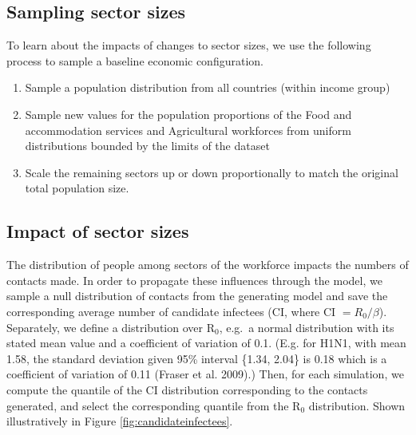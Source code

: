 \documentclass[
]{article}
\providecommand{\tightlist}{%
  \setlength{\itemsep}{0pt}\setlength{\parskip}{0pt}}
\begin{document}
\newpage

\hypertarget{sampling-sector-sizes}{%
\subsection{Sampling sector sizes}\label{sampling-sector-sizes}}

To learn about the impacts of changes to sector sizes, we use the following process to sample a baseline economic configuration.

\begin{enumerate}
\def\labelenumi{\arabic{enumi}.}
\tightlist
\item
  Sample a population distribution from all countries (within income group)
\item
  Sample new values for the population proportions of the Food and accommodation services and Agricultural workforces from uniform distributions bounded by the limits of the dataset
\item
  Scale the remaining sectors up or down proportionally to match the original total population size.
\end{enumerate}

\hypertarget{impact-of-sector-sizes}{%
\subsection{Impact of sector sizes}\label{impact-of-sector-sizes}}

The distribution of people among sectors of the workforce impacts the numbers of contacts made. In order to propagate these influences through the model, we sample a null distribution of contacts from the generating model and save the corresponding average number of candidate infectees (CI, where CI \(=R_0/\beta\)). Separately, we define a distribution over R\(_0\), e.g.~a normal distribution with its stated mean value and a coefficient of variation of 0.1. (E.g. for H1N1, with mean 1.58, the standard deviation given 95\% interval \{1.34, 2.04\} is 0.18 which is a coefficient of variation of 0.11 (Fraser et al. 2009).) Then, for each simulation, we compute the quantile of the CI distribution corresponding to the contacts generated, and select the corresponding quantile from the R\(_0\) distribution. Shown illustratively in Figure \ref{fig:candidateinfectees}.
\end{document}
